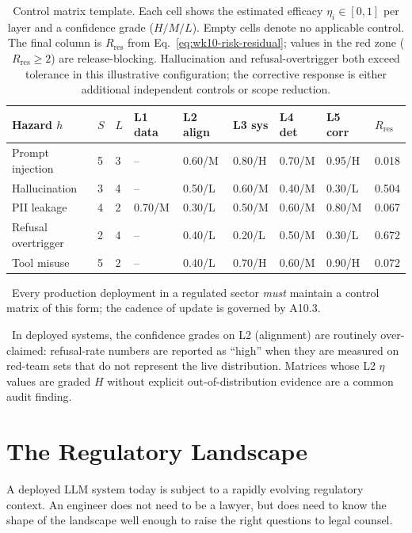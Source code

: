\begin{table}[H]
\centering
\footnotesize
\begin{tabular}{L{2.2cm} C{1.1cm} C{1.1cm} C{1.1cm} C{1.1cm} C{1.1cm} C{1.1cm} C{1.1cm} C{1.3cm}}
\toprule
\textbf{Hazard $h$} & \textbf{$S$} & \textbf{$L$}
  & \textbf{L1 data} & \textbf{L2 align} & \textbf{L3 sys}
  & \textbf{L4 det} & \textbf{L5 corr} & \textbf{$R_\mathrm{res}$} \\
\midrule
Prompt injection    & 5 & 3 & --
  & 0.60/M & 0.80/H & 0.70/M & 0.95/H & 0.018 \\
Hallucination       & 3 & 4 & --
  & 0.50/L & 0.60/M & 0.40/M & 0.30/L & 0.504 \\
PII leakage         & 4 & 2 & 0.70/M
  & 0.30/L & 0.50/M & 0.60/M & 0.80/M & 0.067 \\
Refusal overtrigger & 2 & 4 & --
  & 0.40/L & 0.20/L & 0.50/M & 0.30/L & 0.672 \\
Tool misuse         & 5 & 2 & --
  & 0.40/L & 0.70/H & 0.60/M & 0.90/H & 0.072 \\
\bottomrule
\end{tabular}
\caption{Control matrix template. Each cell shows the estimated
efficacy $\eta_i \in [0, 1]$ per layer and a confidence grade
($H/M/L$). Empty cells denote no applicable control. The final
column is $R_\mathrm{res}$ from
Eq.~\eqref{eq:wk10-risk-residual}; values in the red zone
($R_\mathrm{res} \ge 2$) are release-blocking. Hallucination and
refusal-overtrigger both exceed tolerance in this illustrative
configuration; the corrective response is either additional
independent controls or scope reduction.}
\label{tab:wk10_control_matrix}
\end{table}

\Norm\ Every production deployment in a regulated sector
\emph{must} maintain a control matrix of this form; the cadence
of update is governed by A10.3.

\Find\ In deployed systems, the confidence grades on L2 (alignment)
are routinely over-claimed: refusal-rate numbers are reported as
``high'' when they are measured on red-team sets that do not
represent the live distribution. Matrices whose L2 $\eta$ values
are graded $H$ without explicit out-of-distribution evidence are a
common audit finding.

\section{The Regulatory Landscape}

A deployed LLM system today is subject to a rapidly evolving
regulatory context. An engineer does not need to be a lawyer, but
does need to know the shape of the landscape well enough to raise
the right questions to legal counsel.

